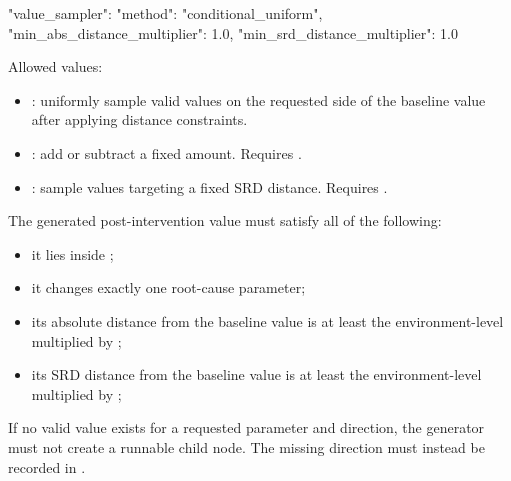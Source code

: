 \documentclass[11pt]{article}
\begin{document}
\begin{DocCode}
"value_sampler": {
  "method": "conditional_uniform",
  "min_abs_distance_multiplier": 1.0,
  "min_srd_distance_multiplier": 1.0
}
\end{DocCode}

Allowed  values:

\begin{itemize}
\item {}: uniformly sample valid values on the requested side of the baseline value after applying distance constraints.
\item {}: add or subtract a fixed amount. Requires .
\item {}: sample values targeting a fixed SRD distance. Requires .
\end{itemize}

The generated post-intervention value must satisfy all of the following:

\begin{itemize}
\item it lies inside ;
\item it changes exactly one root-cause parameter;
\item its absolute distance from the baseline value is at least the environment-level \termMinAbsDist{} multiplied by ;
\item its SRD distance from the baseline value is at least the environment-level \termMinSRDDistance{} multiplied by ;
\end{itemize}

If no valid value exists for a requested parameter and direction, the generator must not create a runnable child node.
The missing direction must instead be recorded in .

\label{sec:environment-description-levels}
\subsection*{\texorpdfstring{}{description\_levels.json}}
\end{document}
